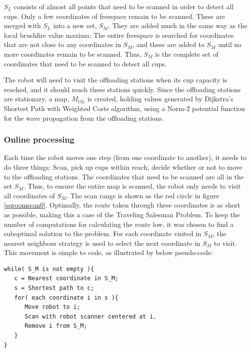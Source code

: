\(S_{L}\) consists of almost all points that need to be scanned in order to detect all cups.
Only a few coordinates of freespace remain to be scanned. These are merged with \(S_{L}\)
into a new set, \(S_{M}\).
They are added much in the same way as the local brushfire value maxima:
The entire freespace is searched for coordinates that are not close to any coordinates in \(S_{M}\),
and these are added to \(S_{M}\) until no more coordinates remain to be scanned.
Thus, \(S_{M}\) is the complete set of coordinates that need to be scanned to detect all cups.

The robot will need to visit the offloading stations when its cup capacity is reached, and it should
reach these stations quickly. Since the offloading stations are stationary, a map, \(M_{OL}\) is created,
holding values generated by Dijkstra's Shortest Path with Weighted Costs algorithm, using a Norm-2 potential function
for the wave propagation from the offloading stations.

\subsubsection{Online processing}

Each time the robot moves one step (from one coordinate to another),
it needs to do three things: Scan, pick up cups within reach, decide whether or not to move to the offloading stations.
The coordinates that need to be scanned are all in the set \(S_{M}\).
Thus, to ensure the entire map is scanned, the robot only needs to visit all coordinates of \(S_{M}\).
The scan range is shown as the red circle in figure \ref{sqroomscan0}.
Optimally, the route taken through these coordinates is as short as possible,
making this a case of the Traveling Salesman Problem.
To keep the number of computations for calculating the route low, it was chosen to find a suboptimal solution to the problem.
For each coordinate visited in \(S_{M}\), the nearest neighbour strategy is used to select the next coordinate in \(S_{M}\) to visit.
This movement is simple to code, as illustrated by below pseudo-code:

\begin{verbatim}
while( S_M is not empty ){
   c = Nearest coordinate in S_M;
   s = Shortest path to c;
   for( each coordinate i in s ){
      Move robot to i;
      Scan with robot scanner centered at i.
      Remove i from S_M;
   }
}
\end{verbatim}

